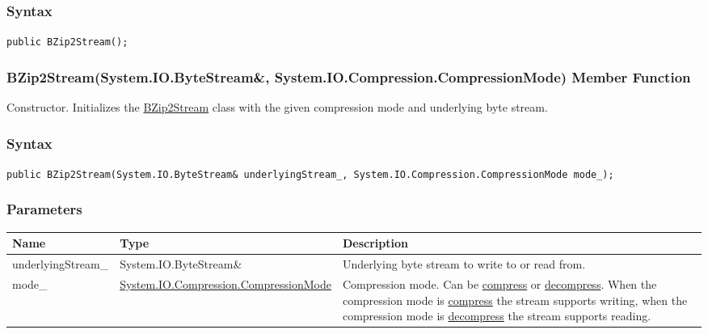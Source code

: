 \documentclass[a4paper,oneside,11.000000pt]{book}
\begin{document}
\subsubsection*{Syntax}
\texttt{public BZip2Stream();}
\clearpage

\hypertarget{System.IO.Compression.BZip2Stream.constructor.P.System.IO.Compression.BZip2Stream.R.System.IO.ByteStream.System.IO.Compression.CompressionMode}{\subsubsection*{BZip2Stream(System.IO.ByteStream\&, System.IO.Compression.CompressionMode) Member Function}}
\begin{flushleft}
Constructor. Initializes the \hyperlink{System.IO.Compression.BZip2Stream}{BZip2Stream} class with the given compression mode and underlying byte stream.

\end{flushleft}
\subsubsection*{Syntax}
\texttt{public BZip2Stream(System.IO.ByteStream\& underlyingStream\_, System.IO.Compression.CompressionMode mode\_);}
\subsubsection*{Parameters}
\begin{flushleft}
\begin{supertabular}[l]{!{\raggedright}p{4.10323cm}!{\raggedright}p{5.76344cm}!{\raggedright}p{4.93333cm}}
\textbf{Name}
& \textbf{Type}
& \textbf{Description}
\\
\hline
underlyingStream\_
& System.\-IO.\-ByteStream\&\-
& Underlying byte stream to write to or read from.

\\
mode\_
& \hyperlink{System.IO.Compression.CompressionMode}{System.\-IO.\-Compression.\-CompressionMode}
& Compression mode. Can be \hyperlink{System.IO.Compression.CompressionMode.compress}{compress} or \hyperlink{System.IO.Compression.CompressionMode.decompress}{decompress}.
When the compression mode is \hyperlink{System.IO.Compression.CompressionMode.compress}{compress} the stream supports writing,
when the compression mode is \hyperlink{System.IO.Compression.CompressionMode.decompress}{decompress} the stream supports reading.

\\
\end{supertabular}

\end{flushleft}
\end{document}
